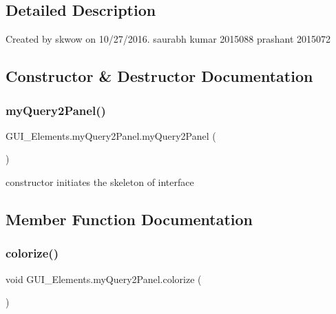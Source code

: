 \subsection{Detailed Description}
Created by skwow on 10/27/2016. saurabh kumar 2015088 prashant 2015072 

\subsection{Constructor \& Destructor Documentation}
\hypertarget{class_g_u_i___elements_1_1my_query2_panel_ac3fc56f3c07e6c0bc190e6e5f4b3a73b}{}\label{class_g_u_i___elements_1_1my_query2_panel_ac3fc56f3c07e6c0bc190e6e5f4b3a73b} 
\subsubsection{\texorpdfstring{my\+Query2\+Panel()}{myQuery2Panel()}}
{\footnotesize\ttfamily G\+U\+I\+\_\+\+Elements.\+my\+Query2\+Panel.\+my\+Query2\+Panel (\begin{DoxyParamCaption}{ }\end{DoxyParamCaption})}



constructor initiates the skeleton of interface 



\subsection{Member Function Documentation}
\hypertarget{class_g_u_i___elements_1_1my_query2_panel_a047854ba4d510a94711c82daa2ca81bb}{}\label{class_g_u_i___elements_1_1my_query2_panel_a047854ba4d510a94711c82daa2ca81bb} 
\subsubsection{\texorpdfstring{colorize()}{colorize()}}
{\footnotesize\ttfamily void G\+U\+I\+\_\+\+Elements.\+my\+Query2\+Panel.\+colorize (\begin{DoxyParamCaption}{ }\end{DoxyParamCaption})}


